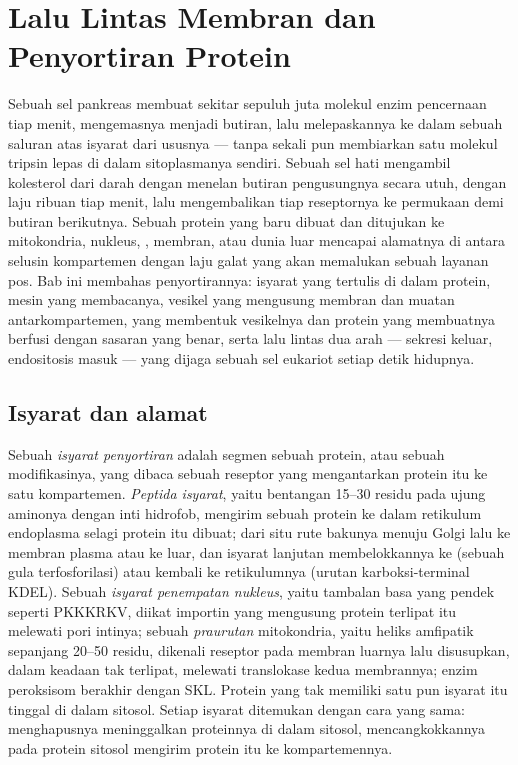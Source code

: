\chapter{Lalu Lintas Membran dan Penyortiran Protein}\label{ch:b3:membrane-traffic}

Sebuah sel pankreas membuat sekitar sepuluh juta molekul enzim pencernaan tiap
menit, mengemasnya menjadi butiran, lalu melepaskannya ke dalam sebuah saluran
atas isyarat dari ususnya --- tanpa sekali pun membiarkan satu molekul tripsin
lepas di dalam sitoplasmanya sendiri. Sebuah sel hati mengambil kolesterol dari
darah dengan menelan butiran pengusungnya secara utuh, dengan laju ribuan tiap
menit, lalu mengembalikan tiap reseptornya ke permukaan demi butiran
berikutnya. Sebuah protein yang baru dibuat dan ditujukan ke mitokondria,
nukleus, , membran, atau dunia luar mencapai alamatnya di antara
selusin kompartemen dengan laju galat yang akan memalukan sebuah layanan pos.
Bab ini membahas penyortirannya: isyarat yang tertulis di dalam protein, mesin
yang membacanya, vesikel yang mengusung membran dan muatan antarkompartemen,
 yang membentuk vesikelnya dan protein yang membuatnya berfusi dengan
sasaran yang benar, serta lalu lintas dua arah --- sekresi keluar, endositosis
masuk --- yang dijaga sebuah sel eukariot setiap detik hidupnya.

\section{Isyarat dan alamat}

\begin{definition}\label{def:b3:membrane-traffic:signals}
%
Sebuah \emph{isyarat penyortiran} adalah segmen sebuah protein, atau sebuah
modifikasinya, yang dibaca sebuah reseptor yang mengantarkan protein itu ke
satu kompartemen. \emph{Peptida isyarat}, yaitu bentangan \numrange{15}{30}
residu pada ujung aminonya dengan inti hidrofob, mengirim sebuah protein ke
dalam retikulum endoplasma selagi protein itu dibuat; dari situ rute bakunya
menuju Golgi lalu ke membran plasma atau ke luar, dan isyarat lanjutan
membelokkannya ke  (sebuah gula terfosforilasi) atau kembali ke
retikulumnya (urutan karboksi-terminal KDEL). Sebuah \emph{isyarat penempatan
nukleus}, yaitu tambalan basa yang pendek seperti PKKKRKV, diikat importin
yang mengusung protein terlipat itu melewati pori intinya; sebuah
\emph{praurutan} mitokondria, yaitu heliks amfipatik sepanjang
\numrange{20}{50} residu, dikenali reseptor pada membran luarnya lalu
disusupkan, dalam keadaan tak terlipat, melewati translokase kedua membrannya;
enzim peroksisom berakhir dengan SKL. Protein yang tak memiliki satu pun
isyarat itu tinggal di dalam sitosol. Setiap isyarat ditemukan dengan cara yang
sama: menghapusnya meninggalkan proteinnya di dalam sitosol, mencangkokkannya
pada protein sitosol mengirim protein itu ke kompartemennya.
\end{definition}


